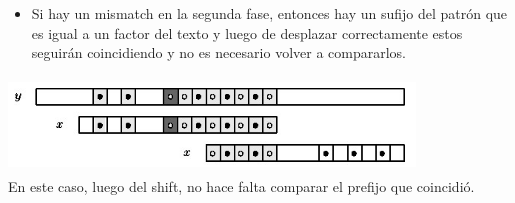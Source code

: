 \documentclass[a4paper, 10pt]{article}
\begin{document}
        		\begin{itemize}
        			\item Si hay un mismatch en la segunda fase, entonces hay un sufijo del patrón que es igual a un factor del texto
        			y luego de desplazar correctamente estos seguirán coincidiendo y no es necesario volver a compararlos.
			\end{itemize}
			\begin{center}
        			\includegraphics[width=4.25in, height=1in]{images/hole}
				\\En este caso, luego del shift, no hace falta comparar el prefijo que coincidió.
		    \end{center}
\end{document}

